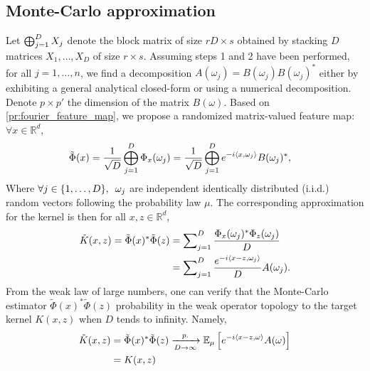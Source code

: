\documentclass[twocolumn]{article}
\begin{document}
\subsection{Monte-Carlo approximation}
Let $\operatorname{\bigoplus}_{j=1}^D X_j$ denote the block matrix of size $rD \times s$ obtained
by stacking $D$ matrices $X_1, \ldots, X_D$ of size $r \times s$.  Assuming
steps 1 and 2 have been performed, for all $j=1, \ldots, n$, we find a
decomposition $A(\omega_j)=B(\omega_j)B(\omega_j)^*$ either by exhibiting a
general analytical closed-form or using a numerical decomposition. Denote $p
\times p'$ the dimension of the matrix $B(\omega)$. Based on
\cref{pr:fourier_feature_map}, we propose a randomized matrix-valued feature
map: $\forall x \in \mathbb{R}^d$,
\begin{equation}
    \label{eq:OV_RFF1}
    \begin{aligned}
        \tilde{\Phi}(x) &=\frac{1}{\sqrt{D}}\operatorname*{\bigoplus}_{j=1}^D \Phi_x(\omega_j) =
        \frac{1}{\sqrt{D}}\operatorname*{\bigoplus}_{j=1}^D e^{-i \langle x,\omega_j\rangle}B(\omega_j)^*,
    \end{aligned}
\end{equation}
Where $\forall j\in {\left\{1, \ldots, D\right\}},\enskip \omega_j$ are independent identically
distributed (i.i.d.) random vectors following the probability law $\mu$. The
corresponding approximation for the kernel is then for all $x,z \in
\mathbb{R}^d$,
\begin{equation}
    \begin{aligned}
        \tilde{K}(x,z)=\tilde{\Phi}(x)^*\tilde{\Phi}(z)
        &=\sum\nolimits_{j=1}^D \frac{\Phi_x(\omega_j)^*
        \Phi_z(\omega_j)}{D} \\
        &=
        \sum\nolimits_{j=1}^D\frac{e^{-i\langle x-z,\omega_j\rangle}}{D}A(\omega_j).
    \end{aligned}
    \label{eq:kernel_approx}
\end{equation}
From the weak law of large numbers, one can verify that the Monte-Carlo
estimator $\tilde{\Phi}(x)^*\tilde{\Phi}(z)$ %
probability in the weak operator topology to the target kernel $K(x,z)$ when
$D$ tends to infinity. Namely, 
\begin{equation*}
    \begin{aligned}
        \tilde{K}(x,z)&=\tilde{\Phi}(x)^*\tilde{\Phi}(z)
        \xrightarrow[D\to\infty]{p.} {\mathbb{E}}_{\mu}\left[
        e^{-i\langle x-z,\omega\rangle}A(\omega) \right] \\
        &=K(x,z)
    \end{aligned}
\end{equation*}
\end{document}
